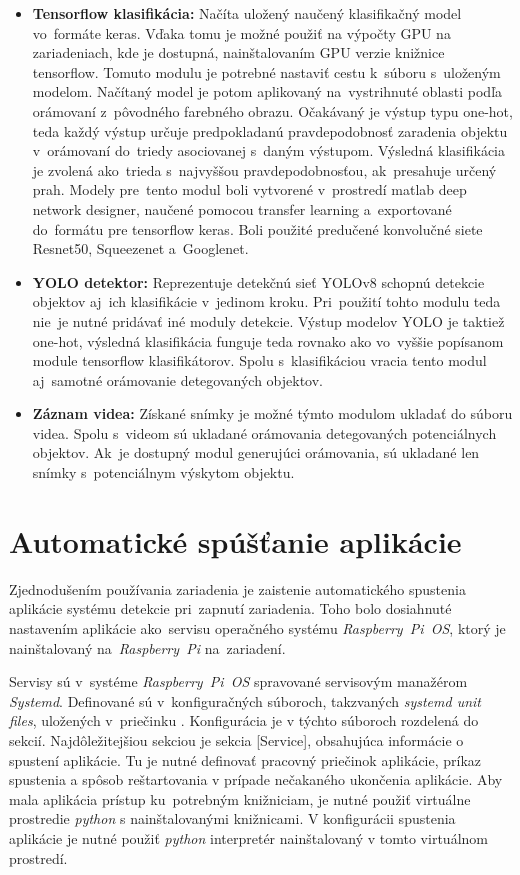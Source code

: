 \begin{itemize}
                \item \textbf{Tensorflow klasifikácia:} Načíta uložený naučený klasifikačný model vo~formáte keras. Vďaka tomu je možné použiť na výpočty GPU na zariadeniach, kde je dostupná, nainštalovaním GPU verzie knižnice tensorflow. Tomuto modulu je potrebné nastaviť cestu k~súboru s~uloženým modelom. Načítaný model je potom aplikovaný na~vystrihnuté oblasti podľa orámovaní z~pôvodného farebného obrazu. Očakávaný je výstup typu one-hot, teda každý výstup určuje predpokladanú pravdepodobnosť zaradenia objektu v~orámovaní do~triedy asociovanej s~daným výstupom. Výsledná klasifikácia je zvolená ako~trieda s~najvyššou pravdepodobnosťou, ak~presahuje určený prah. Modely pre~tento modul boli vytvorené v~prostredí matlab deep network designer, naučené pomocou transfer learning a~exportované do~formátu pre tensorflow keras. Boli použité predučené konvolučné siete Resnet50, Squeezenet a~Googlenet.
                \item \textbf{YOLO detektor:} Reprezentuje detekčnú sieť YOLOv8 schopnú detekcie objektov aj~ich klasifikácie v~jedinom kroku. Pri~použití tohto modulu teda nie~je nutné pridávať iné moduly detekcie. Výstup modelov YOLO je taktiež one-hot, výsledná klasifikácia funguje teda rovnako ako vo~vyššie popísanom module tensorflow klasifikátorov. Spolu s~klasifikáciou vracia tento modul aj~samotné orámovanie detegovaných objektov.
                \item \textbf{Záznam videa:} Získané snímky je možné týmto modulom ukladať do súboru videa. Spolu s~videom sú ukladané orámovania detegovaných potenciálnych objektov. Ak~je dostupný modul generujúci orámovania, sú ukladané len snímky s~potenciálnym výskytom objektu.
            \end{itemize}

    \section{Automatické spúšťanie aplikácie}
        Zjednodušením používania zariadenia je zaistenie automatického spustenia aplikácie systému detekcie pri~zapnutí zariadenia. Toho bolo dosiahnuté nastavením aplikácie ako~servisu operačného systému \emph{Raspberry~Pi~OS}, ktorý je nainštalovaný na~\emph{Raspberry~Pi} na~zariadení.

        Servisy sú v~systéme \emph{Raspberry~Pi~OS} spravované servisovým manažérom \emph{Systemd}. Definované sú v~konfiguračných súboroch, takzvaných \emph{systemd unit files}, uložených v~priečinku . Konfigurácia je v týchto súboroch rozdelená do sekcií. Najdôležitejšiou sekciou je sekcia [Service], obsahujúca informácie o spustení aplikácie. Tu je nutné definovať pracovný priečinok aplikácie, príkaz spustenia a spôsob reštartovania v prípade nečakaného ukončenia aplikácie. Aby mala aplikácia prístup ku~potrebným knižniciam, je nutné použiť virtuálne prostredie \emph{python} s nainštalovanými knižnicami. V konfigurácii spustenia aplikácie je nutné použiť \emph{python} interpretér nainštalovaný v tomto virtuálnom prostredí.

